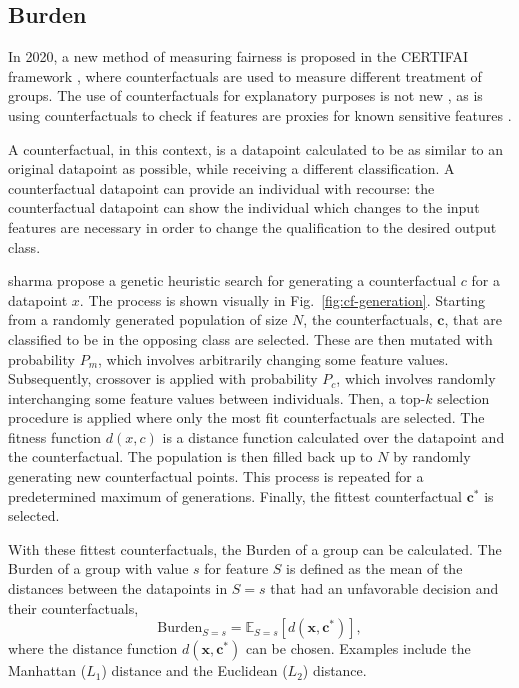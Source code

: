 \documentclass[runningheads]{llncs}
\begin{document}
\subsection{Burden}\label{sec:burden}

In 2020, a new method of measuring fairness is proposed in the CERTIFAI framework \cite{certifai}, where counterfactuals are used to measure different treatment of groups. The use of counterfactuals for explanatory purposes is not new \cite{mothilal2020DICE}, as is using counterfactuals to check if features are proxies for known sensitive features \cite{kusner2017counterfactual-fairness}.

A counterfactual, in this context, is a datapoint calculated to be as similar to an original datapoint as possible, while receiving a different classification. A counterfactual datapoint can provide an individual with \gls{recourse}: 
the counterfactual datapoint can show the individual which changes to the input features are necessary in order to change the qualification to the desired output class.

\Gls{sharma} propose a genetic heuristic search for generating a counterfactual $c$ for a datapoint $x$. The process is shown visually in Fig.~\ref{fig:cf-generation}. Starting from a randomly generated population of size $N$, the counterfactuals, $\mathbf{c}$, that are classified to be in the opposing class are selected. These are then mutated with probability $P_m$, which involves arbitrarily changing some feature values. Subsequently, crossover is applied with probability $P_c$, which involves randomly interchanging some feature values between individuals. Then, a top-$k$ selection procedure is applied where only the most fit counterfactuals are selected. The fitness function $d(x,c)$ is a distance function calculated over the datapoint and the counterfactual. The population is then filled back up to $N$ by randomly generating new counterfactual points. This process is repeated for a predetermined maximum of generations. Finally, the fittest counterfactual $\mathbf{c^*}$ is selected.

With these fittest counterfactuals, the \gls{Burden} of a group can be calculated. The \gls{Burden} of a group with value $s$ for feature $S$ is defined as the mean of the distances between the datapoints in $S=s$ that had an unfavorable decision and their counterfactuals, 
\begin{equation}
    \text{Burden}_{S=s} = \mathbb{E}_{S=s}[d(\mathbf{x}, \mathbf{c^*})],
\end{equation}
where the distance function $d(\mathbf{x}, \mathbf{c^*})$ can be chosen. Examples include the Manhattan ($L_1$) distance and the Euclidean ($L_2$) distance.
\end{document}
